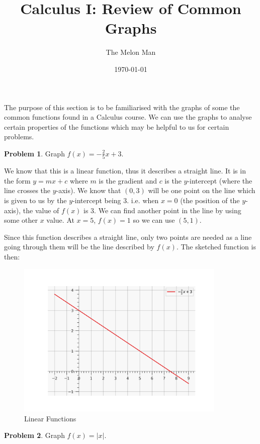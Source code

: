 \documentclass[12pt]{article}
\title{Calculus I: Review of Common Graphs}
\author{The Melon Man}
\date{\today}
\theoremstyle{definition}
\newtheorem{problem}{Problem}
\begin{document}
\maketitle

The purpose of this section is to be familiarised with the graphs of some the common functions found in a Calculus course.
We can use the graphs to analyse certain properties of the functions which may be helpful to us for certain problems.

\begin{problem}
Graph $\displaystyle f(x) = -\frac{2}{5}x + 3$.
\end{problem}

We know that this is a linear function, thus it describes a straight line.
It is in the form $y=mx+c$ where $m$ is the gradient and $c$ is the $y$-intercept (where the line crosses the $y$-axis).
We know that $(0, 3)$ will be one point on the line which is given to us by the $y$-intercept being 3.
i.e. when $x=0$ (the position of the $y$-axis), the value of $f(x)$ is 3.
We can find another point in the line by using some other $x$ value.
At $x=5$, $f(x)=1$ so we can use $(5, 1)$.

Since this function describes a straight line, only two points are needed as a line going through them will be the line described by $f(x)$.
The sketched function is then:

\begin{figure}[H]
    \centering
    \includegraphics[width=10cm, keepaspectratio]{graph_1.png}
    \caption{Linear Functions}
    \label{fig:fig1}
\end{figure}

\begin{problem}
Graph $f(x) = |x|$.
\end{problem}
\end{document}
